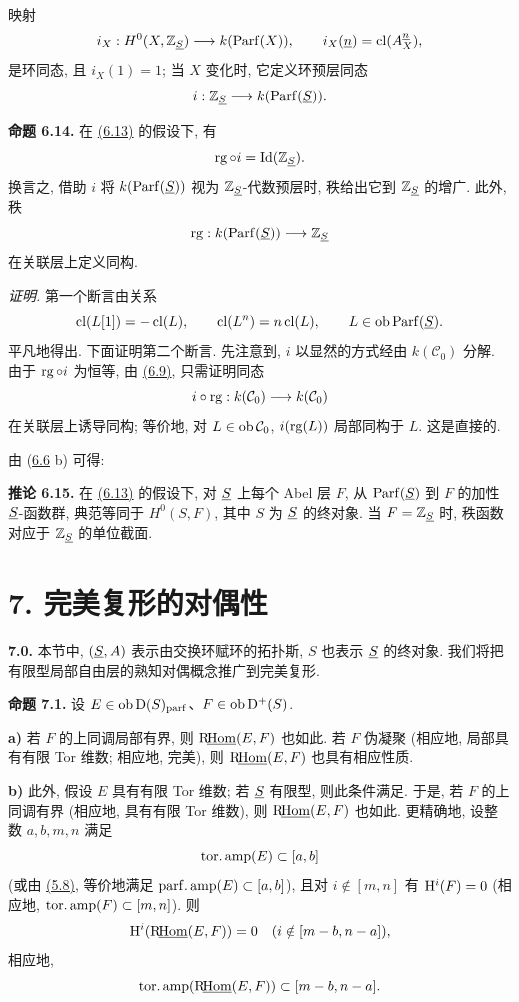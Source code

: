 映射
\[
  i_X:H^0(X,\mathbb Z_{\underline S})\longrightarrow k(\operatorname{Parf}(X)),
  \qquad i_X(\underline n)=\operatorname{cl}(A_X^{\underline n}),
\]
是环同态, 且 \(i_X(1)=1\); 当 \(X\) 变化时, 它定义环预层同态
\[
  i:\mathbb Z_{\underline S}\longrightarrow k(\operatorname{Parf}(\underline S)).
\]

\textbf{命题 6.14.} 在 \hyperlink{sga6.e01.para.6-13}{(6.13)} 的假设下, 有
\[
  \operatorname{rg}\circ i=\operatorname{Id}(\mathbb Z_{\underline S}).
\]
换言之, 借助 \(i\) 将 \(k(\operatorname{Parf}(\underline S))\) 视为 \(\mathbb Z_{\underline S}\)-代数预层时, 秩给出它到 \(\mathbb Z_{\underline S}\) 的增广. 此外, 秩
\[
  \operatorname{rg}:k(\operatorname{Parf}(\underline S))\longrightarrow \mathbb Z_{\underline S}
\]
在关联层上定义同构.

\emph{证明.} 第一个断言由关系
\[
  \operatorname{cl}(L[1])=-\operatorname{cl}(L),\qquad \operatorname{cl}(L^n)=n\operatorname{cl}(L),
  \qquad L\in\operatorname{ob}\operatorname{Parf}(\underline S).
\]
平凡地得出. 下面证明第二个断言. 先注意到, \(i\) 以显然的方式经由 \(k(\mathcal C_0)\) 分解. 由于 \(\operatorname{rg}\circ i\) 为恒等, 由 \hyperlink{sga6.e01.para.6-9}{(6.9)}, 只需证明同态
\[
  i\circ\operatorname{rg}:k(\mathcal C_0)\longrightarrow k(\mathcal C_0)
\]
在关联层上诱导同构; 等价地, 对 \(L\in\operatorname{ob}\mathcal C_0\), \(i(\operatorname{rg}(L))\) 局部同构于 \(L\). 这是直接的.

由 (\hyperlink{sga6.e01.rem.6-6}{6.6} b) 可得:

\textbf{推论 6.15.} 在 \hyperlink{sga6.e01.para.6-13}{(6.13)} 的假设下, 对 \(\underline S\) 上每个 Abel 层 \(F\), 从 \(\operatorname{Parf}(\underline S)\) 到 \(F\) 的加性 \(\underline S\)-函数群, 典范等同于 \(H^0(S,F)\), 其中 \(S\) 为 \(\underline S\) 的终对象. 当 \(F=\mathbb Z_{\underline S}\) 时, 秩函数对应于 \(\mathbb Z_{\underline S}\) 的单位截面.

\section*{7. 完美复形的对偶性}

\textbf{7.0.} 本节中, \((\underline S,A)\) 表示由交换环赋环的拓扑斯, \(S\) 也表示 \(\underline S\) 的终对象. 我们将把有限型局部自由层的熟知对偶概念推广到完美复形.

\textbf{命题 7.1.} 设 \(E\in\operatorname{ob}\mathrm D(S)_{\mathrm{parf}}\)、\(F\in\operatorname{ob}\mathrm D^+(S)\).

\textbf{a)} 若 \(F\) 的上同调局部有界, 则 \(\mathrm R\!\underline{\operatorname{Hom}}(E,F)\) 也如此. 若 \(F\) 伪凝聚 (相应地, 局部具有有限 Tor 维数; 相应地, 完美), 则 \(\mathrm R\!\underline{\operatorname{Hom}}(E,F)\) 也具有相应性质.

\textbf{b)} 此外, 假设 \(E\) 具有有限 Tor 维数; 若 \(\underline S\) 有限型, 则此条件满足. 于是, 若 \(F\) 的上同调有界 (相应地, 具有有限 Tor 维数), 则 \(\mathrm R\!\underline{\operatorname{Hom}}(E,F)\) 也如此. 更精确地, 设整数 \(a,b,m,n\) 满足
\[
  \operatorname{tor.amp}(E)\subset[a,b]
\]
(或由 \hyperlink{sga6.e01.thm.5-8}{(5.8)}, 等价地满足 \(\operatorname{parf.amp}(E)\subset[a,b]\)), 且对 \(i\notin[m,n]\) 有 \(\mathrm H^i(F)=0\) (相应地, \(\operatorname{tor.amp}(F)\subset[m,n]\)). 则
\[
  \mathrm H^i(\mathrm R\!\underline{\operatorname{Hom}}(E,F))=0\quad(i\notin[m-b,n-a]),
\]
相应地,
\[
  \operatorname{tor.amp}(\mathrm R\!\underline{\operatorname{Hom}}(E,F))\subset[m-b,n-a].
\]


